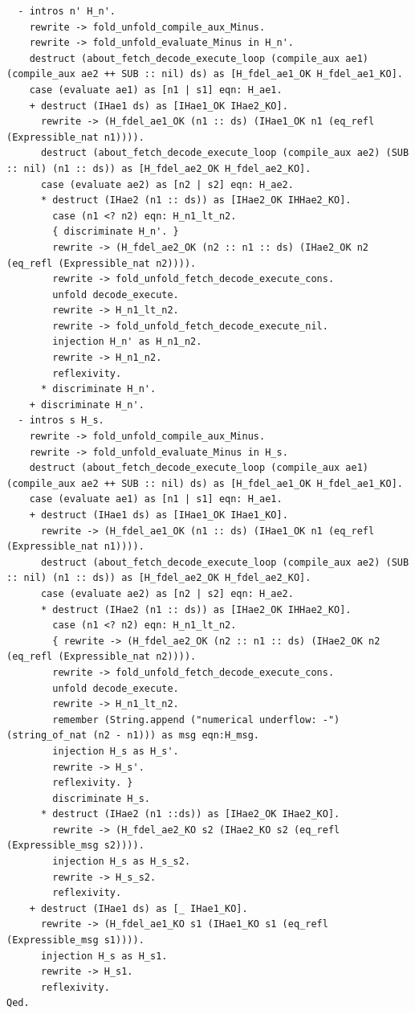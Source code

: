 \documentclass{article}
\begin{document}
\begin{lstlisting}
  - intros n' H_n'.
    rewrite -> fold_unfold_compile_aux_Minus.
    rewrite -> fold_unfold_evaluate_Minus in H_n'.
    destruct (about_fetch_decode_execute_loop (compile_aux ae1) (compile_aux ae2 ++ SUB :: nil) ds) as [H_fdel_ae1_OK H_fdel_ae1_KO].
    case (evaluate ae1) as [n1 | s1] eqn: H_ae1.
    + destruct (IHae1 ds) as [IHae1_OK IHae2_KO].
      rewrite -> (H_fdel_ae1_OK (n1 :: ds) (IHae1_OK n1 (eq_refl (Expressible_nat n1)))).
      destruct (about_fetch_decode_execute_loop (compile_aux ae2) (SUB :: nil) (n1 :: ds)) as [H_fdel_ae2_OK H_fdel_ae2_KO].
      case (evaluate ae2) as [n2 | s2] eqn: H_ae2.
      * destruct (IHae2 (n1 :: ds)) as [IHae2_OK IHHae2_KO].
        case (n1 <? n2) eqn: H_n1_lt_n2.
        { discriminate H_n'. }
        rewrite -> (H_fdel_ae2_OK (n2 :: n1 :: ds) (IHae2_OK n2 (eq_refl (Expressible_nat n2)))).
        rewrite -> fold_unfold_fetch_decode_execute_cons.
        unfold decode_execute.
        rewrite -> H_n1_lt_n2.
        rewrite -> fold_unfold_fetch_decode_execute_nil.
        injection H_n' as H_n1_n2.
        rewrite -> H_n1_n2.
        reflexivity. 
      * discriminate H_n'.
    + discriminate H_n'.
  - intros s H_s.
    rewrite -> fold_unfold_compile_aux_Minus.
    rewrite -> fold_unfold_evaluate_Minus in H_s.
    destruct (about_fetch_decode_execute_loop (compile_aux ae1) (compile_aux ae2 ++ SUB :: nil) ds) as [H_fdel_ae1_OK H_fdel_ae1_KO].
    case (evaluate ae1) as [n1 | s1] eqn: H_ae1.
    + destruct (IHae1 ds) as [IHae1_OK IHae1_KO].
      rewrite -> (H_fdel_ae1_OK (n1 :: ds) (IHae1_OK n1 (eq_refl (Expressible_nat n1)))).
      destruct (about_fetch_decode_execute_loop (compile_aux ae2) (SUB :: nil) (n1 :: ds)) as [H_fdel_ae2_OK H_fdel_ae2_KO].
      case (evaluate ae2) as [n2 | s2] eqn: H_ae2.
      * destruct (IHae2 (n1 :: ds)) as [IHae2_OK IHHae2_KO].
        case (n1 <? n2) eqn: H_n1_lt_n2.
        { rewrite -> (H_fdel_ae2_OK (n2 :: n1 :: ds) (IHae2_OK n2 (eq_refl (Expressible_nat n2)))).
        rewrite -> fold_unfold_fetch_decode_execute_cons.
        unfold decode_execute.
        rewrite -> H_n1_lt_n2.
        remember (String.append ("numerical underflow: -") (string_of_nat (n2 - n1))) as msg eqn:H_msg.
        injection H_s as H_s'.
        rewrite -> H_s'.
        reflexivity. }
        discriminate H_s.
      * destruct (IHae2 (n1 ::ds)) as [IHae2_OK IHae2_KO].
        rewrite -> (H_fdel_ae2_KO s2 (IHae2_KO s2 (eq_refl (Expressible_msg s2)))).
        injection H_s as H_s_s2.
        rewrite -> H_s_s2.
        reflexivity.   
    + destruct (IHae1 ds) as [_ IHae1_KO].
      rewrite -> (H_fdel_ae1_KO s1 (IHae1_KO s1 (eq_refl (Expressible_msg s1)))).
      injection H_s as H_s1.
      rewrite -> H_s1.
      reflexivity.
Qed. 
\end{lstlisting}
\end{document}
